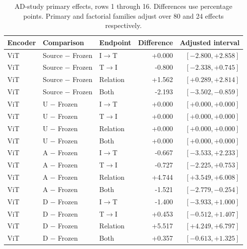 \begin{table}[t]
\centering
\small
\setlength{\tabcolsep}{3pt}
\begin{tabular}{lllrr}
\toprule
Encoder & Comparison & Endpoint & Difference & Adjusted interval\\
\midrule
ViT & Source $-$ Frozen & I$\to$T & +0.000 & $[-2.800,+2.858]$ \\
ViT & Source $-$ Frozen & T$\to$I & -0.800 & $[-2.338,+0.745]$ \\
ViT & Source $-$ Frozen & Relation & +1.562 & $[+0.289,+2.814]$ \\
ViT & Source $-$ Frozen & Both & -2.193 & $[-3.502,-0.859]$ \\
ViT & U $-$ Frozen & I$\to$T & +0.000 & $[+0.000,+0.000]$ \\
ViT & U $-$ Frozen & T$\to$I & +0.000 & $[+0.000,+0.000]$ \\
ViT & U $-$ Frozen & Relation & +0.000 & $[+0.000,+0.000]$ \\
ViT & U $-$ Frozen & Both & +0.000 & $[+0.000,+0.000]$ \\
ViT & A $-$ Frozen & I$\to$T & -0.667 & $[-3.533,+2.233]$ \\
ViT & A $-$ Frozen & T$\to$I & -0.727 & $[-2.225,+0.753]$ \\
ViT & A $-$ Frozen & Relation & +4.744 & $[+3.549,+6.008]$ \\
ViT & A $-$ Frozen & Both & -1.521 & $[-2.779,-0.254]$ \\
ViT & D $-$ Frozen & I$\to$T & -1.400 & $[-3.933,+1.000]$ \\
ViT & D $-$ Frozen & T$\to$I & +0.453 & $[-0.512,+1.407]$ \\
ViT & D $-$ Frozen & Relation & +5.517 & $[+4.249,+6.797]$ \\
ViT & D $-$ Frozen & Both & +0.357 & $[-0.613,+1.325]$ \\
\bottomrule
\end{tabular}
\caption{AD-study primary effects, rows 1 through 16. Differences use percentage points. Primary and factorial families adjust over 80 and 24 effects respectively.}\label{tab:adprimary0}
\end{table}


